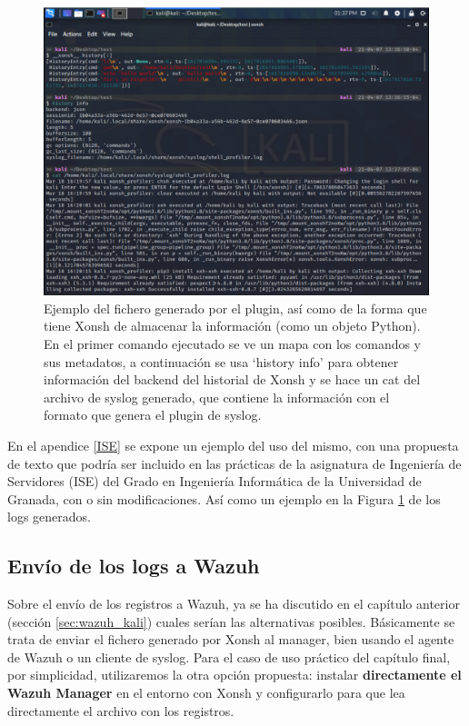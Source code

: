 \begin{figure}[!hbt]
  \centering
  \includegraphics[width=\textwidth]{imagenes/syslog_plugin.png}
  \caption{Ejemplo del fichero generado por el plugin, así como de la forma que tiene Xonsh de almacenar la información (como un objeto Python). En el primer comando ejecutado se ve un mapa con los comandos y sus metadatos, a continuación se usa `history info' para obtener información del backend del historial de Xonsh y se hace un cat del archivo de syslog generado, que contiene la información con el formato que genera el plugin de syslog.}
  \label{syslog_plugin}
\end{figure}

En el apendice \ref{ISE} se expone un ejemplo del uso del mismo, con una propuesta de texto que podría ser incluido en las prácticas de la asignatura de Ingeniería de Servidores (ISE) del Grado en Ingeniería Informática de la Universidad de Granada, con o sin modificaciones. Así como un ejemplo en la Figura \ref{syslog_plugin} de los logs generados.





\subsection{Envío de los logs a Wazuh}

Sobre el envío de los registros a Wazuh, ya se ha discutido en el capítulo anterior (sección \ref{sec:wazuh_kali}) cuales serían las alternativas posibles. Básicamente se trata de enviar el fichero generado por Xonsh al manager, bien usando el agente de Wazuh o un cliente de syslog. Para el caso de uso práctico del capítulo final, por simplicidad, utilizaremos la otra opción propuesta: instalar \textbf{directamente el Wazuh Manager} en el entorno con Xonsh y configurarlo para que lea directamente el archivo con los registros.

